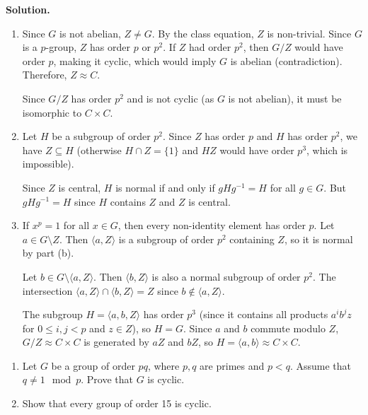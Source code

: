 \noindent\textbf{Solution.}
\begin{enumerate}[label=(\alph*)]
\item Since $G$ is not abelian, $Z \neq G$. By the class equation, $Z$ is non-trivial. Since $G$ is a $p$-group, $Z$ has order $p$ or $p^2$. If $Z$ had order $p^2$, then $G/Z$ would have order $p$, making it cyclic, which would imply $G$ is abelian (contradiction). Therefore, $Z \approx C$.

Since $G/Z$ has order $p^2$ and is not cyclic (as $G$ is not abelian), it must be isomorphic to $C \times C$.

\item Let $H$ be a subgroup of order $p^2$. Since $Z$ has order $p$ and $H$ has order $p^2$, we have $Z \subseteq H$ (otherwise $H \cap Z = \{1\}$ and $HZ$ would have order $p^3$, which is impossible).

Since $Z$ is central, $H$ is normal if and only if $gHg^{-1} = H$ for all $g \in G$. But $gHg^{-1} = H$ since $H$ contains $Z$ and $Z$ is central.

\item If $x^p = 1$ for all $x \in G$, then every non-identity element has order $p$. Let $a \in G \setminus Z$. Then $\langle a, Z \rangle$ is a subgroup of order $p^2$ containing $Z$, so it is normal by part (b).

Let $b \in G \setminus \langle a, Z \rangle$. Then $\langle b, Z \rangle$ is also a normal subgroup of order $p^2$. The intersection $\langle a, Z \rangle \cap \langle b, Z \rangle = Z$ since $b \notin \langle a, Z \rangle$.

The subgroup $H = \langle a, b, Z \rangle$ has order $p^3$ (since it contains all products $a^ib^jz$ for $0 \leq i, j < p$ and $z \in Z$), so $H = G$. Since $a$ and $b$ commute modulo $Z$, $G/Z \approx C \times C$ is generated by $aZ$ and $bZ$, so $H = \langle a, b \rangle \approx C \times C$.
\end{enumerate}

\begin{problembox}
\begin{enumerate}[label=(\alph*)]
\item Let $G$ be a group of order $pq$, where $p, q$ are primes and $p < q$. Assume that $q \neq 1 \mod p$. Prove that $G$ is cyclic.
\item Show that every group of order 15 is cyclic.
\end{enumerate}
\end{problembox}

